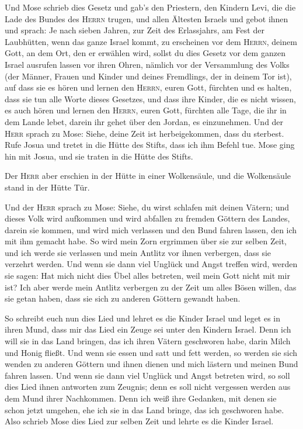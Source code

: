  Und Mose schrieb dies Gesetz und gab's den Priestern, den
Kindern Levi, die die Lade des Bundes des \textsc{Herrn} trugen, und
allen Ältesten Israels  und gebot ihnen und sprach: Je
nach sieben Jahren, zur Zeit des Erlassjahrs, am Fest der Laubhütten,
 wenn das ganze Israel kommt, zu erscheinen vor dem
\textsc{Herrn}, deinem Gott, an dem Ort, den er erwählen wird, sollst du
dies Gesetz vor dem ganzen Israel ausrufen lassen vor ihren Ohren,
 nämlich vor der Versammlung des Volks (der Männer,
Frauen und Kinder und deines Fremdlings, der in deinem Tor ist), auf
dass sie es hören und lernen den \textsc{Herrn}, euren Gott, fürchten
und es halten, dass sie tun alle Worte dieses Gesetzes, 
und dass ihre Kinder, die es nicht wissen, es auch hören und lernen den
\textsc{Herrn}, euren Gott, fürchten alle Tage, die ihr in dem Lande
lebet, darein ihr gehet über den Jordan, es einzunehmen. 
Und der \textsc{Herr} sprach zu Mose: Siehe, deine Zeit ist
herbeigekommen, dass du sterbest. Rufe Josua und tretet in die Hütte des
Stifts, dass ich ihm Befehl tue. Mose ging hin mit Josua, und sie traten
in die Hütte des Stifts.

 Der \textsc{Herr} aber erschien in der Hütte in einer
Wolkensäule, und die Wolkensäule stand in der Hütte Tür.

 Und der \textsc{Herr} sprach zu Mose: Siehe, du wirst
schlafen mit deinen Vätern; und dieses Volk wird aufkommen und wird
abfallen zu fremden Göttern des Landes, darein sie kommen, und wird mich
verlassen und den Bund fahren lassen, den ich mit ihm gemacht habe.
 So wird mein Zorn ergrimmen über sie zur selben Zeit,
und ich werde sie verlassen und mein Antlitz vor ihnen verbergen, dass
sie verzehrt werden. Und wenn sie dann viel Unglück und Angst treffen
wird, werden sie sagen: Hat mich nicht dies Übel alles betreten, weil
mein Gott nicht mit mir ist?  Ich aber werde mein Antlitz
verbergen zu der Zeit um alles Bösen willen, das sie getan haben, dass
sie sich zu anderen Göttern gewandt haben.

 So schreibt euch nun dies Lied und lehret es die Kinder
Israel und leget es in ihren Mund, dass mir das Lied ein Zeuge sei unter
den Kindern Israel.  Denn ich will sie in das Land
bringen, das ich ihren Vätern geschworen habe, darin Milch und Honig
fließt. Und wenn sie essen und satt und fett werden, so werden sie sich
wenden zu anderen Göttern und ihnen dienen und mich lästern und meinen
Bund fahren lassen.  Und wenn sie dann viel Unglück und
Angst betreten wird, so soll dies Lied ihnen antworten zum Zeugnis; denn
es soll nicht vergessen werden aus dem Mund ihrer Nachkommen. Denn ich
weiß ihre Gedanken, mit denen sie schon jetzt umgehen, ehe ich sie in
das Land bringe, das ich geschworen habe.  Also schrieb
Mose dies Lied zur selben Zeit und lehrte es die Kinder Israel.

